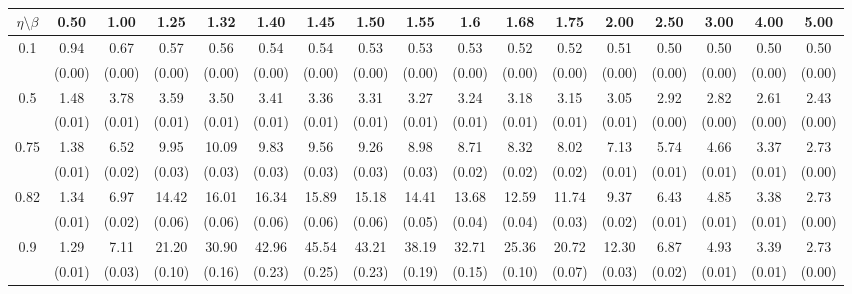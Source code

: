 \documentclass[12pt]{article}  %
\theoremstyle{plain}
\begin{document}
\begin{sidewaystable}[htbp]
\centering
{}
\label{ATS_10-7}
\ \\
\begin{tabular}{ccccccccccccccccc}
\hline
$\eta \setminus \beta $        & 0.50   & 1.00   & 1.25   & 1.32   & 1.40   & 1.45   & 1.50   & 1.55   & 1.6   & 1.68   & 1.75   & 2.00   & 2.50   & 3.00   & 4.00  &5.00 \\ \hline
\multirow{2}{*}{0.1}  & 0.94& 0.67 & 0.57 & 0.56 &  0.54 &  0.54   &0.53  & 0.53  & 0.53 & 0.52 & 0.52  &0.51&  0.50 & 0.50 & 0.50 & 0.50 \\
                      & (0.00) & (0.00) & (0.00) & (0.00) & (0.00) & (0.00) & (0.00) & (0.00) & (0.00) & (0.00) & (0.00) & (0.00) & (0.00) & (0.00) & (0.00) & (0.00)\\ \hline
\multirow{2}{*}{0.5}  & 1.48 &3.78 & 3.59 & 3.50  & 3.41 &  3.36  & 3.31 &  3.27  & 3.24 & 3.18 & 3.15&  3.05 & 2.92&  2.82 & 2.61 & 2.43 \\
                      & (0.01) & (0.01) & (0.01) & (0.01) & (0.01) & (0.01) & (0.01) & (0.01) & (0.01) & (0.01) & (0.01) & (0.01)  & (0.00) & (0.00) & (0.00)&(0.00)\\ \hline
\multirow{2}{*}{0.75}  & 1.38 &6.52 & 9.95 &10.09  & 9.83  & 9.56  & 9.26 &  8.98 &  8.71 & 8.32 & 8.02 & 7.13  &5.74 & 4.66 & 3.37 & 2.73\\
                      & (0.01)& (0.02)& (0.03)& (0.03)& (0.03)& (0.03)& (0.03)& (0.03)& (0.02)&  (0.02)&  (0.02)&  (0.01)&  (0.01)&  (0.01)&  (0.01)  &   (0.00)\\ \hline
\multirow{2}{*}{0.82}  & 1.34 &6.97 &14.42 &16.01 & 16.34&  15.89 & 15.18  &14.41 & 13.68 &12.59& 11.74 & 9.37 & 6.43 & 4.85 & 3.38 & 2.73\\
                      & (0.01)& (0.02)& (0.06)& (0.06)& (0.06)& (0.06)& (0.06)& (0.05)& (0.04)&  (0.04)&  (0.03)&  (0.02)&  (0.01)&  (0.01)&  (0.01)&   (0.00)\\ \hline
\multirow{2}{*}{0.9}  & 1.29 &7.11 &21.20 &30.90 & 42.96 & 45.54 & 43.21 & 38.19 & 32.71 &25.36& 20.72 &12.30 & 6.87 & 4.93&  3.39 & 2.73\\
                      & (0.01)& (0.03)& (0.10)& (0.16)& (0.23)& (0.25)& (0.23)& (0.19)& (0.15)&  (0.10)&  (0.07)&  (0.03)&  (0.02)&  (0.01)&  (0.01) &   (0.00)\\ \hline                                               

\end{tabular}
\end{sidewaystable}
\end{document}
